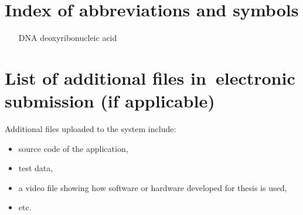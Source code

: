 \documentclass[a4paper,twoside,12pt]{book}
\begin{document}
\begin{appendices} 


 

\chapter*{Index of abbreviations and symbols}

\begin{itemize}
\item[DNA] deoxyribonucleic acid
\end{itemize}




\chapter*{List of additional files in~electronic submission (if applicable)}

Additional files uploaded to the system include:
\begin{itemize}
\item source code of the application,
\item test data,
\item a video file showing how software or hardware developed for thesis is used,
\item etc.
\end{itemize}
 
\listoffigures
{}
\listoftables
{}

\end{appendices}
\end{document}
